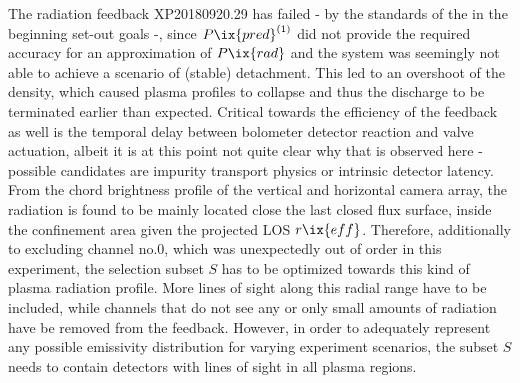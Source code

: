             The radiation feedback XP20180920.29 has failed - by the standards of the in the beginning set-out goals -, since $P\ix{pred}^{\left(1\right)}$ did not provide the required accuracy for an approximation of $P\ix{rad}$ and the system was seemingly not able to achieve a scenario of (stable) detachment. This led to an overshoot of the  density, which caused plasma profiles to collapse and thus the discharge to be terminated earlier than expected. Critical towards the efficiency of the feedback as well is the temporal delay between bolometer detector reaction and valve actuation, albeit it is at this point not quite clear why that is observed here - possible candidates are impurity transport physics or intrinsic detector latency. From the chord brightness profile of the vertical and horizontal camera array, the radiation is found to be mainly located close the last closed flux surface, inside the confinement area given the projected LOS $r\ix{eff}$. Therefore, additionally to excluding channel no.0, which was unexpectedly out of order in this experiment, the selection subset $S$ has to be optimized towards this kind of plasma radiation profile. More lines of sight along this radial range have to be included, while channels that do not see any or only small amounts of radiation have be removed from the feedback. However, in order to adequately represent any possible emissivity distribution for varying experiment scenarios, the subset $S$ needs to contain detectors with lines of sight in all plasma regions.%
%
